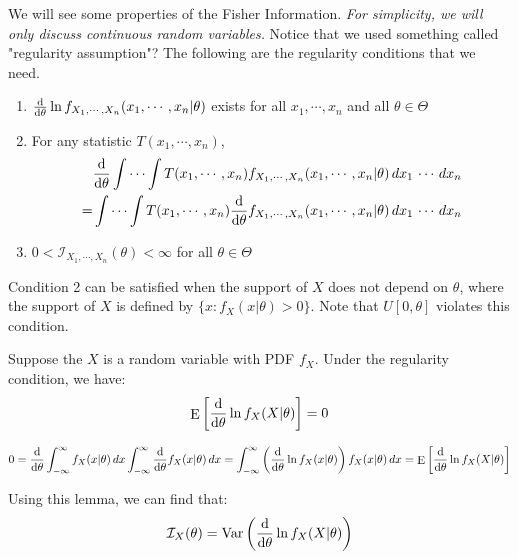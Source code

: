 \documentclass{huhtakm-template-book-v2}
\DeclareMathOperator{\E}{E}
\DeclareMathOperator{\Var}{Var}
\begin{document}
\newpage
We will see some properties of the Fisher Information. \textit{For simplicity, we will only discuss continuous random variables.} Notice that we used something called "regularity assumption"? The following are the regularity conditions that we need.
\begin{enumerate}
	\item $\odv*{}{\theta}\ln{f_{X_{1},\cdots,X_{n}}}(x_{1},\cdots,x_{n}|\theta)$ exists for all $x_{1},\cdots,x_{n}$ and all $\theta\in\Theta$
	\item For any statistic $T(x_{1},\cdots,x_{n})$,
	\begin{align*}
		&\odv*{}{\theta}\int\cdots\int T(x_{1},\cdots,x_{n})f_{X_{1},\cdots,X_{n}}(x_{1},\cdots,x_{n}|\theta)\,dx_{1}\,\cdots\,dx_{n}\\
		=&\int\cdots\int T(x_{1},\cdots,x_{n})\odv*{}{\theta}f_{X_{1},\cdots,X_{n}}(x_{1},\cdots,x_{n}|\theta)\,dx_{1}\,\cdots\,dx_{n}
	\end{align*}
	\item $0<\mathcal{I}_{X_{1},\cdots,X_{n}}(\theta)<\infty$ for all $\theta\in\Theta$
\end{enumerate}
Condition 2 can be satisfied when the support of $X$ does not depend on $\theta$, where the support of $X$ is defined by $\{x:f_{X}(x|\theta)>0\}$. Note that $U[0,\theta]$ violates this condition.
\begin{lem}
	\label{Chapter 2 (Lemma) Expectation of Fisher Information but with first moment is zero}
	Suppose the $X$ is a random variable with PDF $f_{X}$. Under the regularity condition, we have:
	\begin{equation*}
		\E\left[\odv*{}{\theta}\ln{f_{X}(X|\theta)}\right]=0
	\end{equation*}
\end{lem}
\begin{proofing}
	\begin{equation*}
		0=\odv*{}{\theta}\intinfty f_{X}(x|\theta)\,dx\intinfty\odv*{}{\theta}f_{X}(x|\theta)\,dx=\intinfty\left(\odv*{}{\theta}\ln{f_{X}(x|\theta)}\right)f_{X}(x|\theta)\,dx=\E\left[\odv*{}{\theta}\ln{f_{X}(X|\theta)}\right]
	\end{equation*}
\end{proofing}
\begin{rem}
	Using this lemma, we can find that:
	\begin{equation*}
		\mathcal{I}_{X}(\theta)=\Var\left(\odv*{}{\theta}\ln{f_{X}(X|\theta)}\right)
	\end{equation*}
\end{rem}
\end{document}
